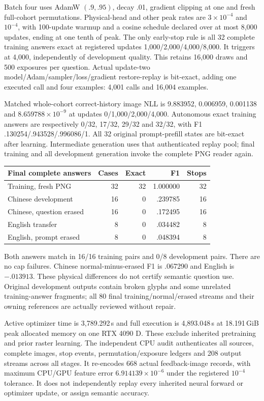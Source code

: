 \documentclass[10pt,a4paper]{article}
\begin{document}
Batch four uses AdamW $(.9,.95)$, decay .01, gradient clipping at one and
fresh full-cohort permutations. Physical-head and other peak rates are
$3\times10^{-4}$ and $10^{-4}$, with 100-update warmup and a cosine schedule
declared over at most 8,000 updates, ending at one tenth of peak. The only
early-stop rule is all 32 complete training answers exact at registered
updates 1,000/2,000/4,000/8,000. It triggers at 4,000, independently of
development quality. This retains 16,000 draws and 500 exposures per question.
Actual update-two model/Adam/sampler/loss/gradient restore-replay is bit-exact,
adding one executed call and four examples: 4,001 calls and 16,004 examples.

Matched whole-cohort correct-history image NLL is 9.883952, 0.006959,
0.001138 and $8.659788\times10^{-9}$ at updates 0/1,000/2,000/4,000.
Autonomous exact training answers are respectively 0/32, 17/32, 29/32 and
32/32, with F1 .130254/.943528/.996086/1. All 32 original prompt-prefill
states are bit-exact after learning. Intermediate generation uses that
authenticated replay pool; final training and all development generation
invoke the complete PNG reader again.

\begin{center}\begin{tabular}{lrrrr}
Final complete answers & Cases & Exact & F1 & Stops\\\hline
Training, fresh PNG & 32 & 32 & 1.000000 & 32\\
Chinese development & 16 & 0 & .239785 & 16\\
Chinese, question erased & 16 & 0 & .172495 & 16\\
English transfer & 8 & 0 & .034482 & 8\\
English, prompt erased & 8 & 0 & .048394 & 8\\
\end{tabular}\end{center}
Both answers match in 16/16 training pairs and 0/8 development pairs. There
are no cap failures. Chinese normal-minus-erased F1 is .067290 and English
is $-.013913$. These physical differences do not certify semantic question
use. Original development outputs contain broken glyphs and some unrelated
training-answer fragments; all 80 final training/normal/erased streams and
their owning references are actually reviewed without repair.

Active optimizer time is 3,789.292\,s and full execution is 4,893.048\,s at
18.191\,GiB peak allocated memory on one RTX 4090 D. These exclude inherited
pretraining and prior raster learning. The independent CPU audit authenticates
all sources, complete images, stop events, permutation/exposure ledgers and
208 output streams across all stages. It re-encodes 668 actual feedback-image
records, with maximum CPU/GPU feature error $6.914139\times10^{-6}$ under
the registered $10^{-4}$ tolerance. It does not independently replay every
inherited neural forward or optimizer update, or assign semantic accuracy.
\end{document}
